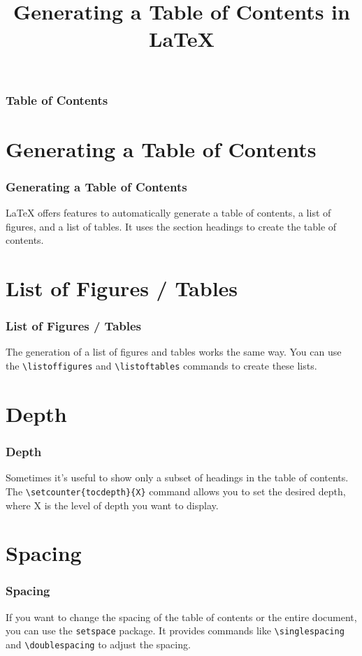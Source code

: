 \documentclass{beamer}
\begin{document}
\title{Generating a Table of Contents in LaTeX}

\frame{\titlepage}

\begin{frame}
\frametitle{Table of Contents}
\tableofcontents
\end{frame}

\section{Generating a Table of Contents}

\begin{frame}
\frametitle{Generating a Table of Contents}
LaTeX offers features to automatically generate a table of contents, a list of figures, and a list of tables. It uses the section headings to create the table of contents.
\end{frame}

\section{List of Figures / Tables}

\begin{frame}
\frametitle{List of Figures / Tables}
The generation of a list of figures and tables works the same way. You can use the \texttt{\textbackslash listoffigures} and \texttt{\textbackslash listoftables} commands to create these lists.
\end{frame}

\section{Depth}

\begin{frame}
\frametitle{Depth}
Sometimes it's useful to show only a subset of headings in the table of contents. The \texttt{\textbackslash setcounter\{tocdepth\}\{X\}} command allows you to set the desired depth, where X is the level of depth you want to display.
\end{frame}

\section{Spacing}

\begin{frame}
\frametitle{Spacing}
If you want to change the spacing of the table of contents or the entire document, you can use the \texttt{setspace} package. It provides commands like \texttt{\textbackslash singlespacing} and \texttt{\textbackslash doublespacing} to adjust the spacing.
\end{frame}
\end{document}
